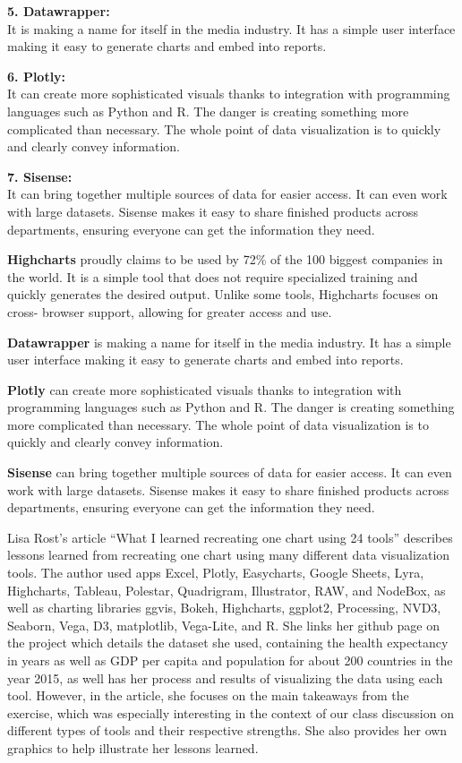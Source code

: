\documentclass[]{book}
\theoremstyle{definition}
\theoremstyle{definition}
\theoremstyle{definition}
\theoremstyle{remark}
\begin{document}
\textbf{5. Datawrapper:}\\
It is making a name for itself in the media industry. It has a simple
user interface making it easy to generate charts and embed into reports.

\textbf{6. Plotly:}\\
It can create more sophisticated visuals thanks to integration with
programming languages such as Python and R. The danger is creating
something more complicated than necessary. The whole point of data
visualization is to quickly and clearly convey information.

\textbf{7. Sisense:}\\
It can bring together multiple sources of data for easier access. It can
even work with large datasets. Sisense makes it easy to share finished
products across departments, ensuring everyone can get the information
they need.

\textbf{Highcharts} proudly claims to be used by 72\% of the 100 biggest
companies in the world. It is a simple tool that does not require
specialized training and quickly generates the desired output. Unlike
some tools, Highcharts focuses on cross- browser support, allowing for
greater access and use.

\textbf{Datawrapper} is making a name for itself in the media industry.
It has a simple user interface making it easy to generate charts and
embed into reports.

\textbf{Plotly} can create more sophisticated visuals thanks to
integration with programming languages such as Python and R. The danger
is creating something more complicated than necessary. The whole point
of data visualization is to quickly and clearly convey information.

\textbf{Sisense} can bring together multiple sources of data for easier
access. It can even work with large datasets. Sisense makes it easy to
share finished products across departments, ensuring everyone can get
the information they need.

Lisa Rost's article ``What I learned recreating one chart using 24
tools'' describes lessons learned from recreating one chart using many
different data visualization tools. The author used apps Excel, Plotly,
Easycharts, Google Sheets, Lyra, Highcharts, Tableau, Polestar,
Quadrigram, Illustrator, RAW, and NodeBox, as well as charting libraries
ggvis, Bokeh, Highcharts, ggplot2, Processing, NVD3, Seaborn, Vega, D3,
matplotlib, Vega-Lite, and R. She links her github page on the project
which details the dataset she used, containing the health expectancy in
years as well as GDP per capita and population for about 200 countries
in the year 2015, as well has her process and results of visualizing the
data using each tool. However, in the article, she focuses on the main
takeaways from the exercise, which was especially interesting in the
context of our class discussion on different types of tools and their
respective strengths. She also provides her own graphics to help
illustrate her lessons learned.
\end{document}
